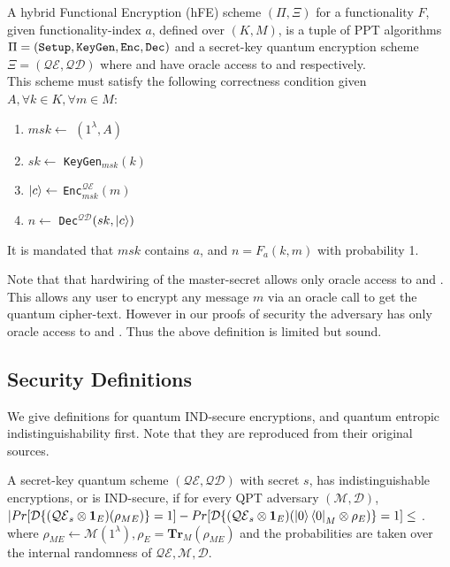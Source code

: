 \begin{definition}
A hybrid Functional Encryption (hFE) scheme $(\Pi,\Xi)$ for a functionality $F$, given functionality-index $a$, defined over $(K,M)$, is a tuple of PPT algorithms $\Pi = (\texttt{Setup},\texttt{KeyGen},\texttt{Enc},\texttt{Dec})$ and a secret-key quantum encryption scheme $\Xi = (\mathcal{QE},\mathcal{QD})$ where \enc and \dec have oracle access to \qenc and \qdec respectively. \\
\newpage
\noindent This scheme must satisfy the following correctness condition given $A, \forall k \in K, \forall m \in M$: \\
\vspace*{-10pt}
\begin{enumerate}
\item $msk \leftarrow$ \setup$(1^\lambda,A)$
\item $sk \leftarrow$ \texttt{KeyGen$_{msk}$}$(k)$
\item $\ket{c} \leftarrow$ \texttt{Enc$_{msk}^\mathcal{QE}$}$(m)$
\item $n \leftarrow$ \texttt{Dec$^\mathcal{QD}$}$(sk,\ket{c})$
\end{enumerate}
It is mandated that $msk$ contains $a$, and $n = F_a(k,m)$ with probability 1.
\end{definition}
Note that that hardwiring of the master-secret allows only oracle access to \kgen and \enc. This allows any user to encrypt any message $m$ via an oracle call to get the quantum cipher-text. However in our proofs of security the adversary has only oracle access to \kgen and \enc. Thus the above definition is limited but sound. \\

\subsection{Security Definitions}
\label{subsec:secdef}

We give definitions for quantum IND-secure encryptions, and quantum entropic indistinguishability first. Note that they are reproduced from their original sources.

\begin{definition}
\label{def:ind-sec}
A secret-key quantum scheme $(\mathcal{QE},\mathcal{QD})$ with secret $s$, has indistinguishable encryptions, or is IND-secure, if for every QPT adversary $(\mathcal{M},\mathcal{D})$, \\
$ \lvert Pr[ \mathcal{D} \{ (\mathcal{QE}_s \otimes \textbf{1}_E) (\rho_{ME}) \} = 1] - Pr[ \mathcal{D} \{ (\mathcal{QE}_s \otimes \textbf{1}_E) (\ket{0}\bra{0}_M \otimes \rho_E) \} = 1] \\ \le $ \negl. \\
where $\rho_{ME} \leftarrow \mathcal{M}(1^\lambda), \rho_E = \textbf{Tr}_M(\rho_{ME})$ and the probabilities are taken over the internal randomness of $\mathcal{QE,M,D}$.
\end{definition}

